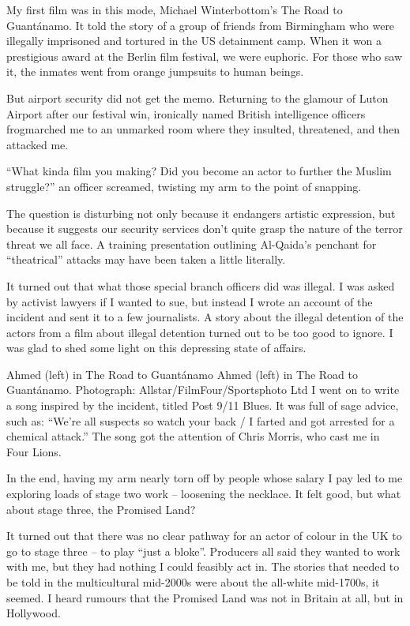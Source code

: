 \documentclass[10pt,a4paper]{article}
\begin{document}
My first film was in this mode, Michael Winterbottom’s The Road to Guantánamo. It told the story of a group of friends from Birmingham who were illegally imprisoned and tortured in the US detainment camp. When it won a prestigious award at the Berlin film festival, we were euphoric. For those who saw it, the inmates went from orange jumpsuits to human beings.

But airport security did not get the memo. Returning to the glamour of Luton Airport after our festival win, ironically named British intelligence officers frogmarched me to an unmarked room where they insulted, threatened, and then attacked me.

“What kinda film you making? Did you become an actor to further the Muslim struggle?” an officer screamed, twisting my arm to the point of snapping.

The question is disturbing not only because it endangers artistic expression, but because it suggests our security services don’t quite grasp the nature of the terror threat we all face. A training presentation outlining Al-Qaida’s penchant for “theatrical” attacks may have been taken a little literally.

It turned out that what those special branch officers did was illegal. I was asked by activist lawyers if I wanted to sue, but instead I wrote an account of the incident and sent it to a few journalists. A story about the illegal detention of the actors from a film about illegal detention turned out to be too good to ignore. I was glad to shed some light on this depressing state of affairs.

Ahmed (left) in The Road to Guantánamo
Ahmed (left) in The Road to Guantánamo. Photograph: Allstar/FilmFour/Sportsphoto Ltd
I went on to write a song inspired by the incident, titled Post 9/11 Blues. It was full of sage advice, such as: “We’re all suspects so watch your back / I farted and got arrested for a chemical attack.” The song got the attention of Chris Morris, who cast me in Four Lions.

In the end, having my arm nearly torn off by people whose salary I pay led to me exploring loads of stage two work – loosening the necklace. It felt good, but what about stage three, the Promised Land?

It turned out that there was no clear pathway for an actor of colour in the UK to go to stage three – to play “just a bloke”. Producers all said they wanted to work with me, but they had nothing I could feasibly act in. The stories that needed to be told in the multicultural mid-2000s were about the all-white mid-1700s, it seemed. I heard rumours that the Promised Land was not in Britain at all, but in Hollywood.
\end{document}
